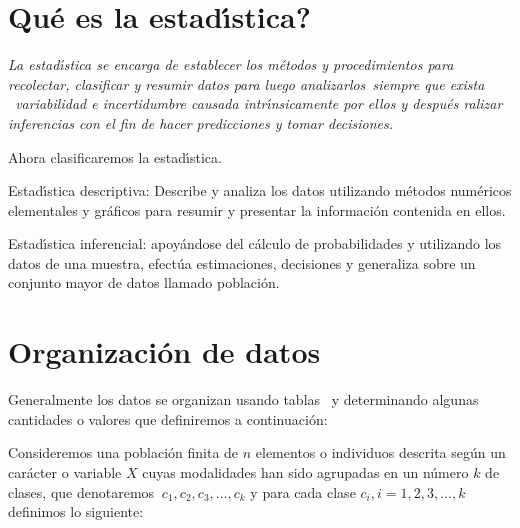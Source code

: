 

\bigskip

\section{\textquestiondown Qu\'{e} es la estad\'{\i}stica?}

\textit{La estad\'{\i}stica se encarga de establecer los m\'{e}todos y
procedimientos para recolectar, clasificar y resumir datos para luego
analizarlos\ siempre que exista \ variabilidad e incertidumbre causada
intr\'{\i}nsicamente por ellos y despu\'{e}s ralizar inferencias con el fin de
hacer predi\-cciones y tomar decisiones. }

Ahora clasificaremos la estad{\'\i}stica.

\begin{criterion}
Estad\'{\i}stica descriptiva: Describe y analiza los datos utilizando
m\'{e}todos num\'{e}ricos elementales y gr\'{a}ficos para resumir y presentar
la informaci\'{o}n contenida en ellos.
\end{criterion}

\begin{criterion}
Estad\'{\i}stica inferencial: apoy{\'{a}}ndose del c\'{a}lculo de
pro\-ba\-bilidades y utilizando los datos de una muestra, efect\'{u}a
estima\-ciones, decisiones y generaliza sobre un conjunto mayor de datos
llamado poblaci\'{o}n.
\end{criterion}

\section{Organizaci\'{o}n de datos}

Generalmente los datos se organizan usando tablas \ y determinando algunas
cantidades o valores que definiremos a continuaci\'{o}n:

Consideremos una poblaci\'{o}n finita de $n$ elementos o indivi\-duos descrita
seg\'{u}n un car\'{a}cter o variable $X$ cuyas modalidades han sido agrupadas
en un n\'{u}mero $k$ de clases, que denotaremos $\ c_{1},c_{2},c_{3}%
,...,c_{k}$ y para cada clase $c_{i},i=1,2,3,...,k$ definimos lo si\-guiente:

